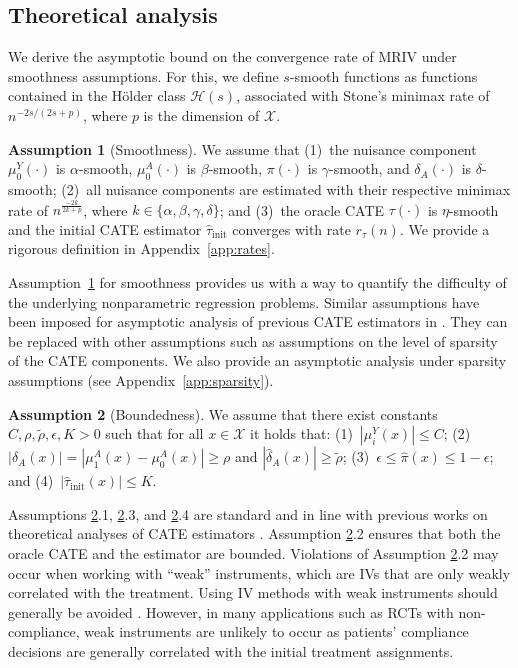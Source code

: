 \documentclass{article} %
\newcommand{\frameworkname}{MRIV\xspace}
\theoremstyle{definition}
\newtheorem{assumption}{Assumption}
\theoremstyle{plain}
\begin{document}
\subsection{Theoretical analysis}
\label{sec:theory}

We derive the asymptotic bound on the convergence rate of \frameworkname under smoothness assumptions. For this, we define $s$-smooth functions as functions contained in the Hölder class $\mathcal{H}(s)$, associated with Stone's minimax rate \citep{Stone.1980} of $n^{-2s/(2s+p)}$, where $p$ is the dimension of $\mathcal{X}$.

\begin{assumption}[Smoothness]\label{ass:smoothness}
We assume that (1)~the nuisance component $\mu_0^Y(\cdot)$ is $\alpha$-smooth, $\mu_0^A(\cdot)$ is $\beta$-smooth, $\pi(\cdot)$ is $\gamma$-smooth, and $\delta_A(\cdot)$ is $\delta$-smooth; (2)~all nuisance components are estimated with their respective minimax rate of $n^{\frac{-2k}{2k+p}}$, where $k \in \{\alpha, \beta, \gamma, \delta\}$; and (3)~the oracle CATE $\tau(\cdot)$ is $\eta$-smooth and the initial CATE estimator $\hat{\tau}_{\mathrm{init}}$ converges with rate $r_{\tau}(n)$. We provide a rigorous definition in Appendix~\ref{app:rates}.
\end{assumption}

Assumption~\ref{ass:smoothness} for smoothness provides us with a way to quantify the difficulty of the underlying nonparametric regression problems. Similar assumptions have been imposed for asymptotic analysis of previous CATE estimators in \citep{Kennedy.2022d, Curth.2021}. They can be replaced with other assumptions such as assumptions on the level of sparsity of the CATE components. We also provide an asymptotic analysis under sparsity assumptions (see Appendix~\ref*{app:sparsity}). 


\begin{assumption}[Boundedness]\label{ass:boundedness}
We assume that there exist constants $C, \rho, \widetilde{\rho}, \epsilon, K>0$ such that for all $x \in \mathcal{X}$ it holds that: (1)~$|\mu_i^Y(x)| \leq C$; (2)~$|\delta_A (x)| = |\mu_1^A(x) - \mu_0^A(x)| \geq \rho$ and $|\hat{\delta}_A (x)| \geq \widetilde{\rho}$; (3)~$\epsilon \leq \hat{\pi}(x) \leq 1 - \epsilon$; and (4)~$|\hat{\tau}_{\mathrm{init}}(x)| \leq K$.
\end{assumption}
Assumptions \ref{ass:boundedness}.1, \ref{ass:boundedness}.3, and \ref{ass:boundedness}.4 are standard and in line with previous works on theoretical analyses of CATE estimators \citep{Curth.2021,Kennedy.2022d}. Assumption \ref{ass:boundedness}.2 ensures that both the oracle CATE and the estimator are bounded. Violations of Assumption \ref{ass:boundedness}.2 may occur when working with ``weak'' instruments, which are IVs that are only weakly correlated with the treatment. Using IV methods with weak instruments should generally be avoided \citep{Li.2022}. However, in many applications such as RCTs with non-compliance, weak instruments are unlikely to occur as patients' compliance decisions are generally correlated with the initial treatment assignments.
\end{document}
